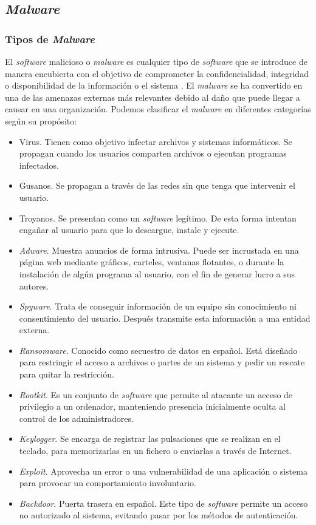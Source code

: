 \subsection{\textit{Malware}}
\label{subsec:malware}

\subsubsection{Tipos de \textit{Malware}}
\label{subsubsec:tipos_malware}
El \textit{software} malicioso o \textit{malware} es cualquier tipo de \textit{software} que se introduce de manera encubierta con el objetivo de comprometer la confidencialidad, integridad o disponibilidad de la información o el sistema \cite{def_malware}. El \textit{malware} se ha convertido en una de las amenazas externas más relevantes debido al daño que puede llegar a causar en una organización. Podemos clasificar el \textit{malware} en diferentes categorías \cite{categoriamw} según su propósito:

\begin{itemize}
	\item Virus. Tienen como objetivo infectar archivos y sistemas informáticos. Se propagan cuando los usuarios comparten archivos o ejecutan programas infectados.
	\item Gusanos. Se propagan a través de las redes sin que tenga que intervenir el usuario.
	\item Troyanos. Se presentan como un \textit{software} legítimo. De esta forma intentan engañar al usuario para que lo descargue, instale y ejecute.
	\item \textit{Adware}. Muestra anuncios de forma intrusiva. Puede ser incrustada en una página web mediante gráficos, carteles, ventanas flotantes, o durante la instalación de algún programa al usuario, con el fin de generar lucro a sus autores.
	\item \textit{Spyware}. Trata de conseguir información de un equipo sin conocimiento ni consentimiento del usuario. Después transmite esta información a una entidad externa.
	\item \textit{Ransomware}. Conocido como secuestro de datos en español. Está diseñado para restringir el acceso a archivos o partes de un sistema y pedir un rescate para quitar la restricción.
	\item \textit{Rootkit}. Es un conjunto de \textit{software} que permite al atacante un acceso de privilegio a un ordenador, manteniendo presencia inicialmente oculta al control de los administradores.
	\item \textit{Keylogger}. Se encarga de registrar las pulsaciones que se realizan en el teclado, para memorizarlas en un fichero o enviarlas a través de Internet.
	\item \textit{Exploit}. Aprovecha un error o una vulnerabilidad de una aplicación o sistema para provocar un comportamiento involuntario.
	\item \textit{Backdoor}. Puerta trasera en español. Este tipo de \textit{software} permite un acceso no autorizado al sistema, evitando pasar por los métodos de autenticación.
\end{itemize}

